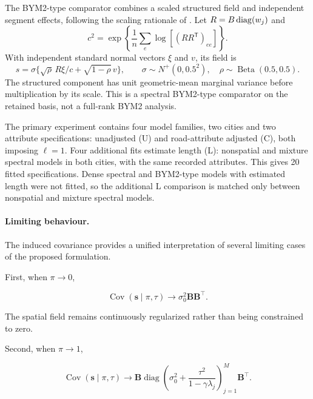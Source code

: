 \documentclass[11pt]{article}
\begin{document}
The BYM2-type comparator combines a scaled structured field and independent segment effects, following the scaling rationale of \citet{riebler2016}. Let $R=B\operatorname{diag}(w_j)$ and
\begin{equation}
 c^2=\exp\left\{\frac{1}{n}\sum_e\log[(RR^{\mathsf T})_{ee}]\right\}.
\end{equation}
With independent standard normal vectors $\xi$ and $v$, its field is
\begin{equation}
 s=\sigma\{\sqrt{\rho}\,R\xi/c+\sqrt{1-\rho}\,v\},\qquad
 \sigma\sim N^+(0,0.5^2),\quad\rho\sim\operatorname{Beta}(0.5,0.5).
\end{equation}
The structured component has unit geometric-mean marginal variance before multiplication by its scale. This is a spectral BYM2-type comparator on the retained basis, not a full-rank BYM2 analysis.

The primary experiment contains four model families, two cities and two attribute specifications: unadjusted (U) and road-attribute adjusted (C), both imposing $\ell=1$. Four additional fits estimate length (L): nonspatial and mixture spectral models in both cities, with the same recorded attributes. This gives 20 fitted specifications. Dense spectral and BYM2-type models with estimated length were not fitted, so the additional L comparison is matched only between nonspatial and mixture spectral models.


\paragraph{Limiting behaviour.}

The induced covariance provides a unified interpretation 
of several limiting cases of the proposed formulation.

First, when $\pi\rightarrow 0$,

\begin{equation}
	\operatorname{Cov}(\mathbf{s}\mid\pi,\tau)
	\longrightarrow
	\sigma_0^2\mathbf{B}\mathbf{B}^{\top}.
\end{equation}

The spatial field remains continuously regularized rather 
than being constrained to zero.

Second, when $\pi\rightarrow 1$,

\begin{equation}
	\operatorname{Cov}(\mathbf{s}\mid\pi,\tau)
	\longrightarrow
	\mathbf{B}
	\operatorname{diag}\left(
	\sigma_0^2+
	\frac{\tau^2}{1-\gamma\lambda_j}
	\right)_{j=1}^{M}
	\mathbf{B}^{\top}.
\end{equation}
\end{document}
